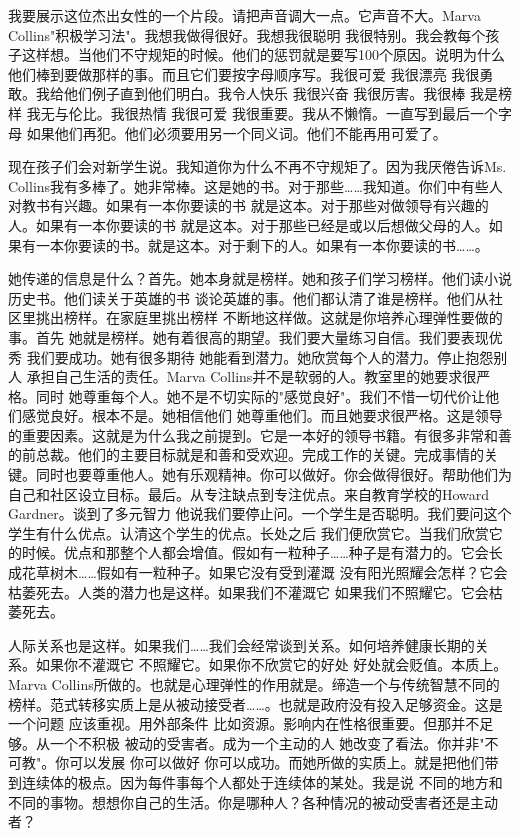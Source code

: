 我要展示这位杰出女性的一个片段。请把声音调大一点。它声音不大。Marva Collins"积极学习法"。我想我做得很好。我想我很聪明 我很特别。我会教每个孩子这样想。当他们不守规矩的时候。他们的惩罚就是要写100个原因。说明为什么他们棒到要做那样的事。而且它们要按字母顺序写。我很可爱 我很漂亮 我很勇敢。我给他们例子直到他们明白。我令人快乐 我很兴奋 我很厉害。我很棒 我是榜样 我无与伦比。我很热情 我很可爱 我很重要。我从不懒惰。一直写到最后一个字母 如果他们再犯。他们必须要用另一个同义词。他们不能再用可爱了。 

现在孩子们会对新学生说。我知道你为什么不再不守规矩了。因为我厌倦告诉Ms. Collins我有多棒了。她非常棒。这是她的书。对于那些……我知道。你们中有些人对教书有兴趣。如果有一本你要读的书 就是这本。对于那些对做领导有兴趣的人。如果有一本你要读的书 就是这本。对于那些已经是或以后想做父母的人。如果有一本你要读的书。就是这本。对于剩下的人。如果有一本你要读的书……。 

她传递的信息是什么？首先。她本身就是榜样。她和孩子们学习榜样。他们读小说 历史书。他们读关于英雄的书 谈论英雄的事。他们都认清了谁是榜样。他们从社区里挑出榜样。在家庭里挑出榜样 不断地这样做。这就是你培养心理弹性要做的事。首先 她就是榜样。她有着很高的期望。我们要大量练习自信。我们要表现优秀 我们要成功。她有很多期待 她能看到潜力。她欣赏每个人的潜力。停止抱怨别人 承担自己生活的责任。Marva Collins并不是软弱的人。教室里的她要求很严格。同时 她尊重每个人。她不是不切实际的"感觉良好"。我们不惜一切代价让他们感觉良好。根本不是。她相信他们 她尊重他们。而且她要求很严格。这是领导的重要因素。这就是为什么我之前提到。它是一本好的领导书籍。有很多非常和善的前总裁。他们的主要目标就是和善和受欢迎。完成工作的关键。完成事情的关键。同时也要尊重他人。她有乐观精神。你可以做好。你会做得很好。帮助他们为自己和社区设立目标。最后。从专注缺点到专注优点。来自教育学校的Howard Gardner。谈到了多元智力 他说我们要停止问。一个学生是否聪明。我们要问这个学生有什么优点。认清这个学生的优点。长处之后 我们便欣赏它。当我们欣赏它的时候。优点和那整个人都会增值。假如有一粒种子……种子是有潜力的。它会长成花草树木……假如有一粒种子。如果它没有受到灌溉 没有阳光照耀会怎样？它会枯萎死去。人类的潜力也是这样。如果我们不灌溉它 如果我们不照耀它。它会枯萎死去。 

人际关系也是这样。如果我们……我们会经常谈到关系。如何培养健康长期的关系。如果你不灌溉它 不照耀它。如果你不欣赏它的好处 好处就会贬值。本质上。Marva Collins所做的。也就是心理弹性的作用就是。缔造一个与传统智慧不同的榜样。范式转移实质上是从被动接受者……。也就是政府没有投入足够资金。这是一个问题 应该重视。用外部条件 比如资源。影响内在性格很重要。但那并不足够。从一个不积极 被动的受害者。成为一个主动的人 她改变了看法。你并非"不可教"。你可以发展 你可以做好 你可以成功。而她所做的实质上。就是把他们带到连续体的极点。因为每件事每个人都处于连续体的某处。我是说 不同的地方和不同的事物。想想你自己的生活。你是哪种人？各种情况的被动受害者还是主动者？ 

